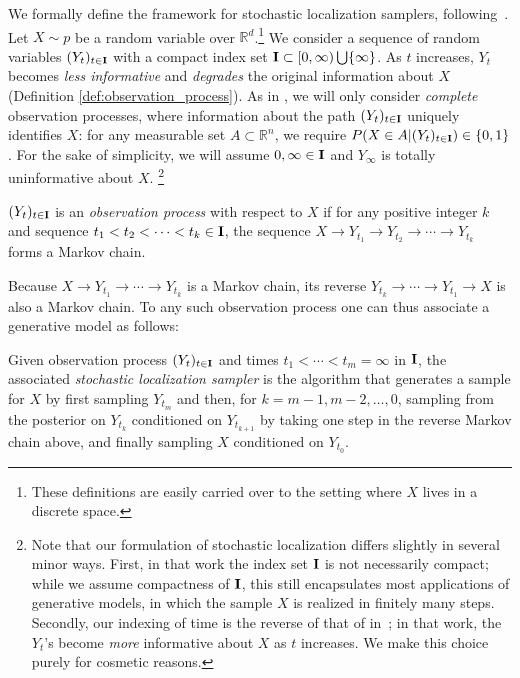 We formally define the framework for stochastic localization samplers, following~\cite{montanari2023samplingdiffusionsstochasticlocalization}. Let $X \sim p$ be a random variable over $\mathbb{R}^d$.\footnote{These definitions are easily carried over to the setting where $X$ lives in a discrete space.} We consider a sequence of random variables $(Y_t)_{t \in \mathbf{I}}$ with a compact index set $\mathbf{I} \subset [0,\infty)\bigcup \{\infty\}$. As $t$ increases, $Y_t$ becomes \emph{less informative} and \emph{degrades} the original information about $X$ (Definition \ref{def:observation_process}). As in \cite{montanari2023samplingdiffusionsstochasticlocalization}, we will only consider \emph{complete} observation processes, where information about the path $(Y_t)_{t \in \mathbf{I}}$ uniquely identifies $X$: for any measurable set $A \subset \mathbb{R}^n$, we require $P(X \in A|(Y_t)_{t \in \mathbf{I}}) \in \{0,1\}$. For the sake of simplicity, we will assume  $0,\infty \in \mathbf{I}$ and $Y_\infty$ is totally uninformative about $X$. \footnote{ Note that our formulation of stochastic localization differs slightly in several minor ways. First, in that work the index set $\mathbf{I}$ is not necessarily compact; while we assume compactness of $\mathbf{I}$, this still encapsulates most applications of generative models, in which the sample $X$ is realized in finitely many steps. Secondly, our indexing of time is the reverse of that of in~\citep{montanari2023samplingdiffusionsstochasticlocalization}; in that work, the $Y_t$'s become \emph{more} informative about $X$ as $t$ increases. We make this choice purely for cosmetic reasons. 
}
\begin{definition}\label{def:observation_process}
$(Y_t)_{t \in \mathbf{I}}$ is an \emph{observation process} with respect to $X$ if 
for any positive integer $k$ and sequence $t_1<t_2<\dots<t_k \in \mathbf{I}$, the sequence $X \rightarrow Y_{t_1} \rightarrow Y_{t_2} \rightarrow \cdots \rightarrow Y_{t_k}$ forms a Markov chain.
\end{definition}


\noindent Because $X\to Y_{t_1}\to \cdots \to Y_{t_k}$ is a Markov chain, its reverse $Y_{t_k} \to \cdots \to Y_{t_1}\to X$ is also a Markov chain. To any such observation process one can thus associate a generative model as follows:

\begin{definition}
    Given observation process $(Y_t)_{t\in \mathbf{I}}$ and times $t_1 < \cdots < t_m = \infty$ in $\mathbf{I}$, the associated \emph{stochastic localization sampler} is the algorithm that generates a sample for $X$ by first sampling $Y_{t_m}$ and then, for $k = m-1,m-2,\ldots,0$, sampling from the posterior on $Y_{t_k}$ conditioned on $Y_{t_{k+1}}$ by taking one step in the reverse Markov chain above, and finally sampling $X$ conditioned on $Y_{t_0}$.
\end{definition}

